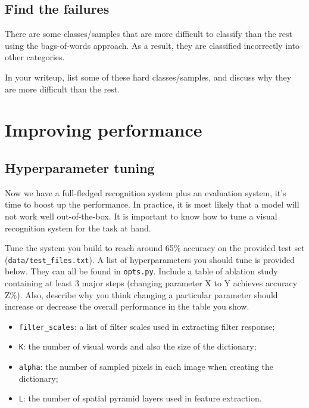 \documentclass[10pt]{article}
\begin{document}
\subsection{Find the failures}
There are some classes/samples that are more difficult to classify than the rest using the bags-of-words approach. As a result, they are classified incorrectly into other categories.\\

\par {}
In your writeup, list some of these hard classes/samples, and discuss why they are more difficult than the rest. 


\section{Improving performance}

\subsection{Hyperparameter tuning}

Now we have a full-fledged recognition system plus an evaluation system, it's time to boost up the performance. In practice, it is most likely that a model will not work well out-of-the-box. It is important to know how to tune a visual recognition system for the task at hand. \\

\par {} Tune the system you build to reach around 65\% accuracy on the provided test set ({\tt data/test\_files.txt}). A list of hyperparameters you should tune is provided below. They can all be found in {\tt opts.py}. Include a table of ablation study containing at least 3 major steps (changing parameter X to Y achieves accuracy Z\%). Also, describe why you think changing a particular parameter should increase or decrease the overall performance in the table you show.

\begin{itemize}
    \item {\tt filter\_scales}: a list of filter scales used in extracting filter response;
    \item {\tt K}: the number of visual words and also the size of the dictionary;
    \item {\tt alpha}: the number of sampled pixels in each image when creating the dictionary;
    \item {\tt L}: the number of spatial pyramid layers used in feature extraction.
\end{itemize}
\end{document}
